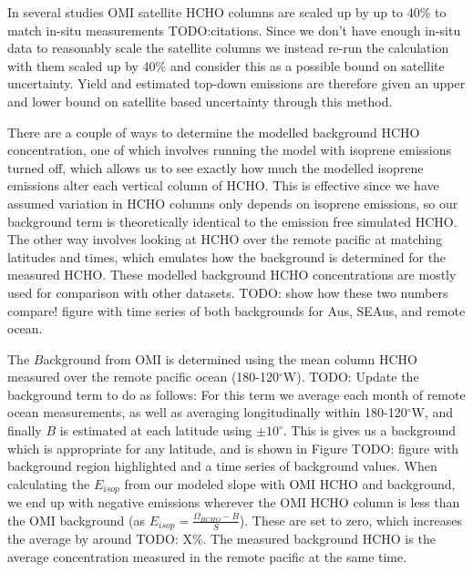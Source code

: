    In several studies OMI satellite HCHO columns are scaled up by up to 40\% to match in-situ measurements TODO:citations.
    Since we don't have enough in-situ data to reasonably scale the satellite columns we instead re-run the calculation with them scaled up by 40\% and consider this as a possible bound on satellite uncertainty.
    Yield and estimated top-down emissions are therefore given an upper and lower bound on satellite based uncertainty through this method.
    
    There are a couple of ways to determine the modelled background HCHO concentration, one of which involves running the model with isoprene emissions turned off, which allows us to see exactly how much the modelled isoprene emissions alter each vertical column of HCHO.
    This is effective since we have assumed variation in HCHO columns only depends on isoprene emissions, so our background term is theoretically identical to the emission free simulated HCHO.
    The other way involves looking at HCHO over the remote pacific at matching latitudes and times, which emulates how the background is determined for the measured HCHO.
    These modelled background HCHO concentrations are mostly used for comparison with other datasets.
    TODO: show how these two numbers compare! figure with time series of both backgrounds for Aus, SEAus, and remote ocean.
    
    The $B$ackground from OMI  is determined using the mean column HCHO measured over the remote pacific ocean (180-120$^{\circ}$W).
    TODO: Update the background term to do as follows: For this term we average each month of remote ocean measurements, as well as averaging longitudinally within 180-120$^{\circ}$W, and finally $B$ is estimated at each latitude using $\pm 10^{\circ}$.
    This is gives us a background which is appropriate for any latitude, and is shown in Figure TODO: figure with background region highlighted and a time series of background values.
    When calculating the $E_{isop}$ from our modeled slope with OMI HCHO and background, we end up with negative emissions wherever the OMI HCHO column is less than the OMI background (as $E_{isop} = \frac{\Omega_{HCHO} - B}{S}$).
    These are set to zero, which increases the average by around TODO: X\%.
    The measured background HCHO is the average concentration measured in the remote pacific at the same time.
    
